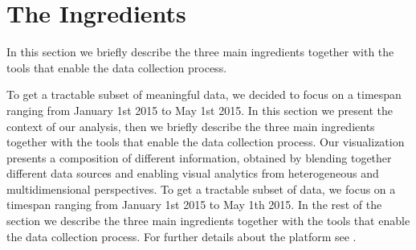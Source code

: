 %
%



\section{The Ingredients}\label{sec:blend-ingredients}

In this section we briefly describe the three main ingredients together with the tools that enable the data collection process.

To get a tractable subset of meaningful data, we decided to focus on a timespan ranging from January 1st 2015 to May 1st 2015.
In this section we present the context of our analysis, then we briefly describe the three main ingredients together with the tools that enable the data collection process.
Our visualization presents a composition of different information, obtained by blending together different data sources and enabling visual analytics from heterogeneous and multidimensional perspectives.
To get a tractable subset of data, we focus on a timespan ranging from January 1st 2015 to May 1th 2015.
In the rest of the section we describe the three main ingredients together with the tools that enable the data collection process.
For further details about the \pha platform see .

